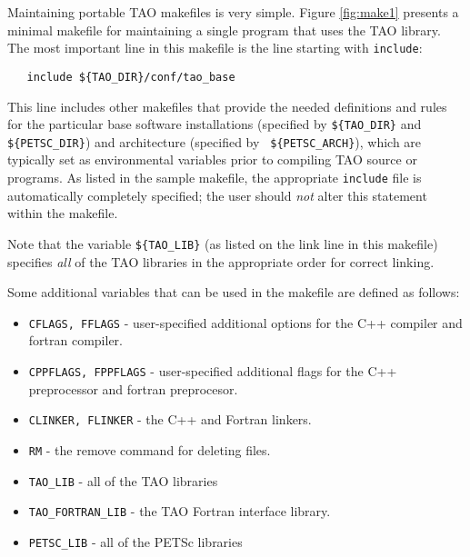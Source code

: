 Maintaining portable TAO makefiles is very simple.  Figure
\ref{fig:make1} presents a minimal makefile for maintaining a single
program that uses the TAO library.  The most important line in this
makefile is the line starting with \texttt{include}:
\begin{verbatim}
   include ${TAO_DIR}/conf/tao_base
\end{verbatim} 
\noindent
{} This line includes other makefiles that provide the
needed definitions and rules for the particular base software
installations (specified by \texttt{\$\{TAO\_DIR\}} and {\tt
  \$\{PETSC\_DIR\}}) and architecture (specified by {\tt
  \$\{PETSC\_ARCH\}}), which are typically set as environmental
variables prior to compiling TAO source or programs.  As listed in the
sample makefile, the appropriate \texttt{include} file is automatically
completely specified; the user should {\em not} alter this statement
within the makefile.

Note that the variable \texttt{\$\{TAO\_LIB\}} (as listed on the link
line in this makefile) specifies {\em all} of the TAO libraries in 
the appropriate order for correct linking.


\begin{comment}
  The second sample makefile, given in Figure~\ref{fig:make2},
  controls the generation of several example programs.  Again, the
  most important line in this makefile is the \texttt{include} line that
  includes the files defining all of the macro variables.
\end{comment}

Some additional variables that can be used in the makefile are defined
as follows:
\begin{itemize}
\item \texttt{CFLAGS, FFLAGS} - user-specified additional options for the
  C++ compiler and fortran compiler.
\item \texttt{CPPFLAGS, FPPFLAGS} - user-specified additional flags
        for the C++ preprocessor and fortran preprocesor.
\item \texttt{CLINKER, FLINKER} - the C++ and Fortran linkers. 
\item \texttt{RM} - the remove command for deleting files.
\item \texttt{TAO\_LIB} - all of the TAO libraries
\item \texttt{TAO\_FORTRAN\_LIB} - the TAO Fortran interface
             library. 
\item \texttt{PETSC\_LIB} - all of the PETSc libraries

\end{itemize}


